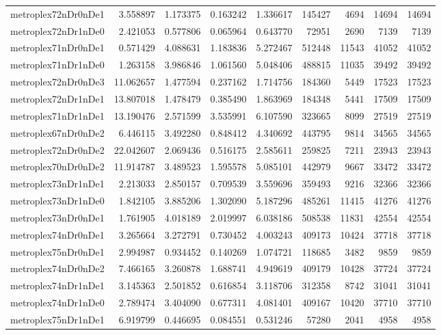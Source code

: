 \documentclass[../../../thesis.tex]{subfiles}
\begin{document}
\begin{longtable}{|l|r|r|r|r|r|r|r|r|}
metroplex72nDr0nDe1 & 3.558897 & 1.173375 & 0.163242 & 1.336617 & 145427 & 4694 & 14694 & 14694 \\
metroplex72nDr1nDe0 & 2.421053 & 0.577806 & 0.065964 & 0.643770 & 72951 & 2690 & 7139 & 7139 \\
metroplex71nDr0nDe1 & 0.571429 & 4.088631 & 1.183836 & 5.272467 & 512448 & 11543 & 41052 & 41052 \\
metroplex71nDr1nDe0 & 1.263158 & 3.986846 & 1.061560 & 5.048406 & 488815 & 11035 & 39492 & 39492 \\
metroplex72nDr0nDe3 & 11.062657 & 1.477594 & 0.237162 & 1.714756 & 184360 & 5449 & 17523 & 17523 \\
metroplex72nDr1nDe1 & 13.807018 & 1.478479 & 0.385490 & 1.863969 & 184348 & 5441 & 17509 & 17509 \\
metroplex71nDr1nDe1 & 13.190476 & 2.571599 & 3.535991 & 6.107590 & 323665 & 8099 & 27519 & 27519 \\
metroplex67nDr0nDe2 & 6.446115 & 3.492280 & 0.848412 & 4.340692 & 443795 & 9814 & 34565 & 34565 \\
metroplex72nDr0nDe2 & 22.042607 & 2.069436 & 0.516175 & 2.585611 & 259825 & 7211 & 23943 & 23943 \\
metroplex70nDr0nDe2 & 11.914787 & 3.489523 & 1.595578 & 5.085101 & 442979 & 9667 & 33472 & 33472 \\
metroplex73nDr1nDe1 & 2.213033 & 2.850157 & 0.709539 & 3.559696 & 359493 & 9216 & 32366 & 32366 \\
metroplex73nDr1nDe0 & 1.842105 & 3.885206 & 1.302090 & 5.187296 & 485261 & 11415 & 41276 & 41276 \\
metroplex73nDr0nDe1 & 1.761905 & 4.018189 & 2.019997 & 6.038186 & 508538 & 11831 & 42554 & 42554 \\
metroplex74nDr0nDe1 & 3.265664 & 3.272791 & 0.730452 & 4.003243 & 409173 & 10424 & 37718 & 37718 \\
metroplex75nDr0nDe1 & 2.994987 & 0.934452 & 0.140269 & 1.074721 & 118685 & 3482 & 9859 & 9859 \\
metroplex74nDr0nDe2 & 7.466165 & 3.260878 & 1.688741 & 4.949619 & 409179 & 10428 & 37724 & 37724 \\
metroplex74nDr1nDe1 & 3.145363 & 2.501852 & 0.616854 & 3.118706 & 312358 & 8742 & 31041 & 31041 \\
metroplex74nDr1nDe0 & 2.789474 & 3.404090 & 0.677311 & 4.081401 & 409167 & 10420 & 37710 & 37710 \\
metroplex75nDr1nDe1 & 6.919799 & 0.446695 & 0.084551 & 0.531246 & 57280 & 2041 & 4958 & 4958 \\

\end{longtable}
\end{document}
